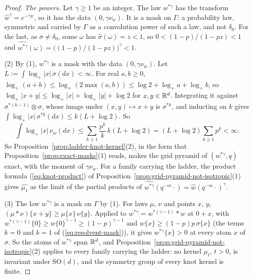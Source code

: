 \begin{proof}
\emph{The powers.} Let $\gamma \ge 1$ be an integer. The law $w^{*\gamma}$ has the transform
$\widehat{w}^\gamma = e^{-\gamma\psi}$, so it has the data $(0, \gamma\nu_w)$. It is a mask on
$\Gamma$: a probability law, symmetric and carried by $\Gamma$ as a convolution power of such a
law, and not $\delta_0$. For the last, as $\sigma \ne \delta_0$, some $\omega$ has
$\widehat{\sigma}(\omega) = z < 1$, so $0 < (1-p)/(1-pz) < 1$ and
$\widehat{w^{*\gamma}}(\omega) = \bigl((1-p)/(1-pz)\bigr)^\gamma < 1$.

(2) By (1), $w^{*\gamma}$ is a mask with the data $(0, \gamma\nu_w)$. Let
$L := \int\log_+|x|\,\sigma(dx) < \infty$. For real $a, b \ge 0$,
$\log_+(a + b) \le \log_+(2\max(a, b)) \le \log 2 + \log_+a + \log_+b$, so
$\log_+|x + y| \le \log_+|x| + \log_+|y| + \log 2$ for $x, y \in \mathbb{R}^d$. Integrating it against
$\sigma^{*(k-1)} \otimes \sigma$, whose image under $(x, y) \mapsto x + y$ is $\sigma^{*k}$, and
inducting on $k$ gives $\int\log_+|x|\,\sigma^{*k}(dx) \le k(L + \log 2)$. So
\[
\int\log_+|x|\,\nu_w(dx) \le \sum_{k \ge 1}\frac{p^k}{k}\,k(L + \log 2)
= (L + \log 2)\sum_{k \ge 1}p^k < \infty .
\]
So Proposition~\ref{prop:ladder-knot-kernel}(2), in the form that
Proposition~\ref{prop:exact-masks}(1) reads, makes the grid pyramid of $(w^{*\gamma}, q)$ exact,
with the moment of $\gamma\nu_w$. For a family carrying the ladder, the product formula
(\ref{eq:knot-product}) of Proposition~\ref{prop:grid-pyramid-not-isotropic}(1) gives
$\widehat{\mu_1}$ as the limit of the partial products of
$\widehat{w^{*\gamma}}(q^{-m}\cdot) = \widehat{w}(q^{-m}\cdot)^\gamma$.

(3) The law $w^{*\gamma}$ is a mask on $\Gamma$ by (1). For laws $\mu$, $\nu$ and points $x$, $y$,
$(\mu * \nu)\{x + y\} \ge \mu\{x\}\,\nu\{y\}$. Applied to $w^{*\gamma} = w^{*(\gamma - 1)} * w$ at
$0 + x$, with $w^{*(\gamma - 1)}\{0\} \ge w\{0\}^{\gamma - 1} \ge (1-p)^{\gamma - 1}$ and
$w\{x\} \ge (1-p)p\,\sigma\{x\}$ (the terms $k = 0$ and $k = 1$ of (\ref{eq:resolvent-mask})), it
gives $w^{*\gamma}\{x\} > 0$ at every atom $x$ of $\sigma$. So the atoms of $w^{*\gamma}$ span
$\mathbb{R}^d$, and Proposition~\ref{prop:grid-pyramid-not-isotropic}(2) applies to every family carrying
the ladder: no kernel $\mu_t$, $t > 0$, is invariant under $\mathrm{SO}(d)$, and the symmetry group of every
knot kernel is finite.


\end{proof}
